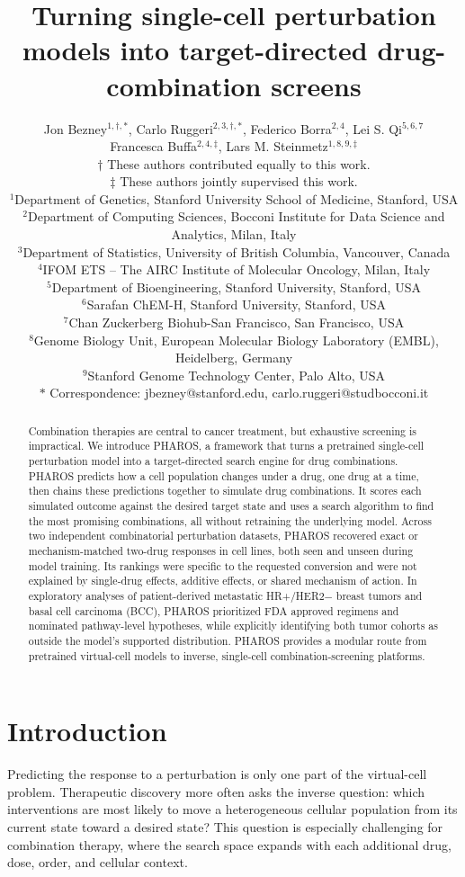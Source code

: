 \documentclass[11pt,a4paper]{article}
\title{\textbf{Turning single-cell perturbation models into target-directed drug-combination screens}}
\author{
Jon Bezney$^{1,\dagger,*}$,
Carlo Ruggeri$^{2,3,\dagger,*}$,
Federico Borra$^{2,4}$,
Lei S. Qi$^{5,6,7}$
\\
Francesca Buffa$^{2,4,\ddagger}$,
Lars M. Steinmetz$^{1,8,9,\ddagger}$
\\[0.5em]
\small $\dagger$ These authors contributed equally to this work.\\
\small $\ddagger$ These authors jointly supervised this work.\\
\small $^1$Department of Genetics, Stanford University School of Medicine, Stanford, USA\\
\small $^2$Department of Computing Sciences, Bocconi Institute for Data Science and Analytics, Milan, Italy\\
\small $^3$Department of Statistics, University of British Columbia, Vancouver, Canada\\
\small $^4$IFOM ETS -- The AIRC Institute of Molecular Oncology, Milan, Italy\\
\small $^5$Department of Bioengineering, Stanford University, Stanford, USA\\
\small $^6$Sarafan ChEM-H, Stanford University, Stanford, USA\\
\small $^7$Chan Zuckerberg Biohub-San Francisco, San Francisco, USA\\
\small $^8$Genome Biology Unit, European Molecular Biology Laboratory (EMBL), Heidelberg, Germany\\
\small $^9$Stanford Genome Technology Center, Palo Alto, USA\\
\noindent
\small $*$ Correspondence: jbezney@stanford.edu, carlo.ruggeri@studbocconi.it
}
\date{}
\begin{document}
\maketitle

\begin{abstract}
Combination therapies are central to cancer treatment, but exhaustive screening is impractical. We introduce PHAROS, a framework that turns a pretrained  single-cell perturbation model into a target-directed search engine for drug combinations. PHAROS predicts how a cell population changes under a drug, one drug at a time, then chains these predictions together to simulate drug combinations. It scores each simulated outcome against the desired target state and uses a search algorithm to find the most promising combinations, all without retraining the underlying model.  Across two independent combinatorial perturbation datasets, PHAROS recovered exact or mechanism-matched two-drug responses in cell lines, both seen and unseen during model training. Its rankings were specific to the requested conversion and were not explained by single-drug effects, additive effects, or shared mechanism of action. In exploratory analyses of patient-derived metastatic HR+/HER2$-$ breast tumors and basal cell carcinoma (BCC), PHAROS prioritized FDA approved regimens and nominated pathway-level hypotheses, while explicitly identifying both tumor cohorts as outside the model's supported distribution. PHAROS provides a modular route from pretrained virtual-cell models to inverse, single-cell combination-screening platforms.
\end{abstract}

\linenumbers

\newpage
\section{Introduction}\label{sec1}

Predicting the response to a perturbation is only one part of the virtual-cell problem. Therapeutic discovery more often asks the inverse question: which interventions are most likely to move a heterogeneous cellular population from its current state toward a desired state? This question is especially challenging for combination therapy, where the search space expands with each additional drug, dose, order, and cellular context.
\end{document}
